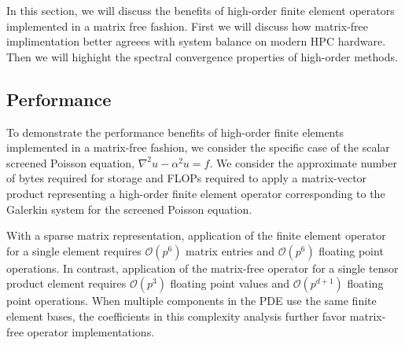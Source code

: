 In this section, we will discuss the benefits of high-order finite element operators implemented in a matrix free fashion.
First we will discuss how matrix-free implimentation better agreees with system balance on modern HPC hardware.
Then we will highight the spectral convergence properties of high-order methods.

\subsection{Performance}

To demonstrate the performance benefits of high-order finite elements implemented in a matrix-free fashion, we consider the specific case of the scalar screened Poisson equation, $\nabla^2 u - \alpha^2 u = f$.
We consider the approximate number of bytes required for storage and FLOPs required to apply a matrix-vector product representing a high-order finite element operator corresponding to the Galerkin system for the screened Poisson equation.

With a sparse matrix representation, application of the finite element operator for a single element requires $\mathcal{O} \left( p^6 \right)$ matrix entries and $\mathcal{O} \left( p^6 \right)$ floating point operations.
In contrast, application of the matrix-free operator for a single tensor product element requires $\mathcal{O} \left( p^3 \right)$ floating point values and $\mathcal{O} \left( p^{d + 1} \right)$ floating point operations.
When multiple components in the PDE use the same finite element bases, the coefficients in this complexity analysis further favor matrix-free operator implementations.

